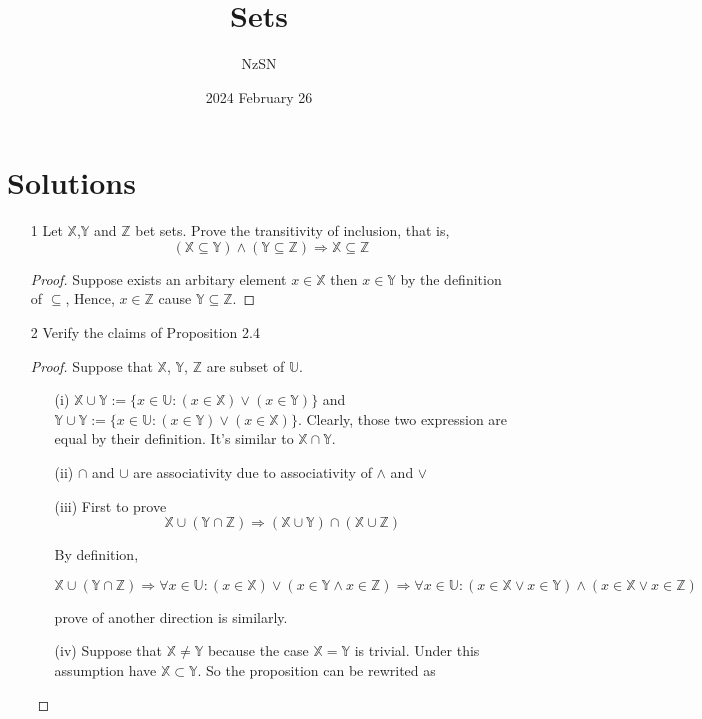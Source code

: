 \documentclass[11pt]{book}
\title{Sets}
\author{NzSN}
\date{2024 February 26}
\newcommand{\bb}[1]{\mathbb{#1}}
\newcommand{\Ra}{\Rightarrow}
\begin{document}
\maketitle

\vspace{0.2 cm}
\section{Solutions}

\begin{enumerate}
\item[1]
        Let $\bb{X}$,$\bb{Y}$ and $\bb{Z}$ bet sets.
        Prove the transitivity of inclusion, that is,
        $$(\bb{X} \subseteq \bb{Y}) \land (\bb{Y} \subseteq \bb{Z}) \Ra \bb{X} \subseteq \bb{Z}$$
\begin{proof}
  Suppose exists an arbitary element $x \in \bb{X}$ then $x \in \bb{Y}$ by the definition of $\subseteq$,
  Hence, $x \in \bb{Z}$ cause $\bb{Y} \subseteq \bb{Z}$.
\end{proof}

\item[2]
        Verify the claims of Proposition 2.4
\begin{proof}
Suppose that $\bb{X}$, $\bb{Y}$, $\bb{Z}$ are subset of $\bb{U}$.
\begin{enumerate}
  \item[(i)]
        $\bb{X} \cup \bb{Y} := \{ x \in \bb{U} : (x \in \bb{X}) \lor (x \in \bb{Y}) \}$ and
        $\bb{Y} \cup \bb{Y} := \{ x \in \bb{U} : (x \in \bb{Y}) \lor (x \in \bb{X}) \}$.
        Clearly, those two expression are equal by their definition. It's similar to $\bb{X} \cap \bb{Y}$.
  \item[(ii)]
        $\cap$ and $\cup$ are associativity due to associativity of $\land$ and $\lor$
  \item[(iii)]
        First to prove
        $$\bb{X} \cup (\bb{Y} \cap \bb{Z}) \Ra
        (\bb{X} \cup \bb{Y}) \cap (\bb{X} \cup \bb{Z})$$

        By definition,

        $$\bb{X} \cup (\bb{Y} \cap \bb{Z}) \Ra
        \forall x \in \bb{U}: (x \in \bb{X}) \lor (x \in \bb{Y} \land x \in \bb{Z})
        \Ra \forall x \in \bb{U}: (x \in \bb{X} \lor x \in \bb{Y}) \land (x \in \bb{X} \lor x \in \bb{Z})$$

        prove of another direction is similarly.
  \item[(iv)]
        Suppose that $\bb{X} \neq \bb{Y}$ because the case $\bb{X} = \bb{Y}$ is trivial. Under this assumption have $\bb{X} \subset \bb{Y}$. So the proposition can be rewrited as


\end{enumerate}
\end{proof}
\end{enumerate}
\end{document}
